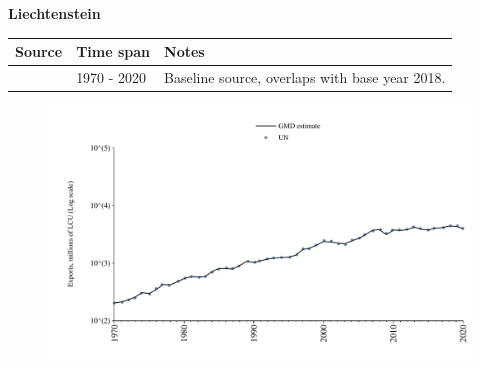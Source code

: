 \documentclass[12pt,a4paper,landscape]{article}
\begin{document}
\begin{adjustbox}{max totalsize={\paperwidth}{\paperheight},center}
\begin{minipage}[t][\textheight][t]{\textwidth}
\vspace*{0.5cm}
{}
\begin{center}
{\Large\bfseries Liechtenstein}
\end{center}
\vspace{0.5cm}
\begin{table}[H]
\centering
\small
\begin{tabular}{|l|l|l|}
\hline
\textbf{Source} & \textbf{Time span} & \textbf{Notes} \\
\hline
\rowcolor{white}\cite{UN}& 1970 - 2020 &Baseline source, overlaps with base year 2018.\\
\hline
\end{tabular}
\end{table}
\begin{figure}[H]
\centering
\includegraphics[width=\textwidth,height=0.6\textheight,keepaspectratio]{graphs/LIE_exports.pdf}
\end{figure}
\end{minipage}
\end{adjustbox}
\end{document}

